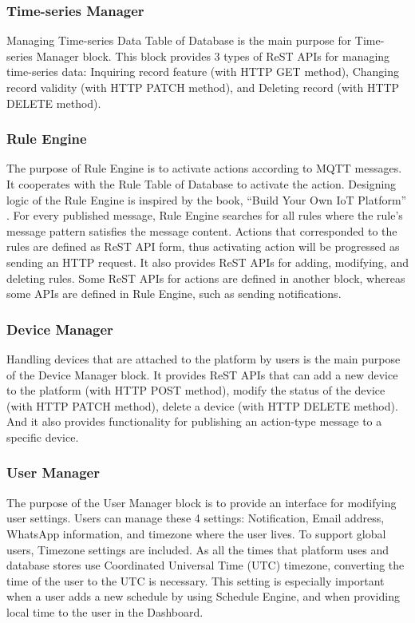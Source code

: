 \documentclass[conference]{IEEEtran}
\begin{document}
\subsubsection{Time-series Manager}
\hfill \break Managing Time-series Data Table of Database is the main purpose for Time-series Manager block. This block provides 3 types of ReST APIs for managing time-series data: Inquiring record feature (with HTTP GET method), Changing record validity (with HTTP PATCH method), and Deleting record (with HTTP DELETE method). 

\subsubsection{Rule Engine}
\hfill \break The purpose of Rule Engine is to activate actions according to MQTT messages. It cooperates with the Rule Table of Database to activate the action. Designing logic of the Rule Engine is inspired by the book, “Build Your Own IoT Platform” \cite{b25}. For every published message, Rule Engine searches for all rules where the rule's message pattern satisfies the message content. Actions that corresponded to the rules are defined as ReST API form, thus activating action will be progressed as sending an HTTP request. It also provides ReST APIs for adding, modifying, and deleting rules. Some ReST APIs for actions are defined in another block, whereas some APIs are defined in Rule Engine, such as sending notifications.

\subsubsection{Device Manager}
\hfill \break Handling devices that are attached to the platform by users is the main purpose of the Device Manager block. It provides ReST APIs that can add a new device to the platform (with HTTP POST method), modify the status of the device (with HTTP PATCH method), delete a device (with HTTP DELETE method). And it also provides functionality for publishing an action-type message to a specific device.

\subsubsection{User Manager}
\hfill \break The purpose of the User Manager block is to provide an interface for modifying user settings. Users can manage these 4 settings: Notification, Email address, WhatsApp information, and timezone where the user lives.  To support global users, Timezone settings are included. As all the times that platform uses and database stores use Coordinated Universal Time (UTC) timezone, converting the time of the user to the UTC is necessary. This setting is especially important when a user adds a new schedule by using Schedule Engine, and when providing local time to the user in the Dashboard.
\end{document}
